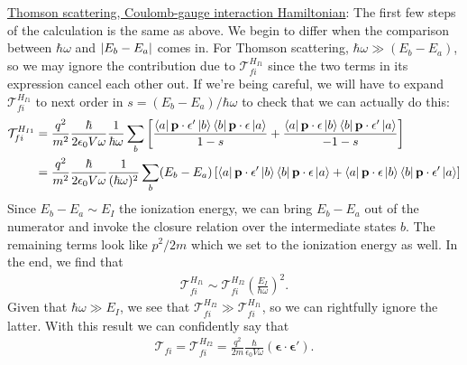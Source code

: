 \documentclass{article}
\theoremstyle{definition}
\newcommand{\f}[2]{\frac{#1}{#2}}
\newcommand{\lp}{\left(}
\newcommand{\rp}{\right)}
\newcommand{\lb}{\left[}
\newcommand{\rb}{\right]}
\begin{document}
\begin{enumerate}[label=(\alph*)]
\noindent \underline{Thomson scattering, Coulomb-gauge interaction Hamiltonian}:  The first few steps of the calculation is the same as above. We begin to differ when the comparison between $\hbar \omega$ and $\abs{E_b - E_a}$ comes in. For Thomson scattering, $\hbar \omega \gg (E_b - E_a)$, so we may ignore the contribution due to $\mathcal{T}_{fi}^{H_{I1}}$ since the two terms in its expression cancel each other out. If we're being careful, we will have to expand $\mathcal{T}_{fi}^{H_{I1}}$ to next order in $s = (E_b - E_a)/\hbar \omega$ to check that we can actually do this:
\begin{align*}
\mathcal{T}_{fi}^{H_{I1}}
&=
\f{q^2}{m^2} \f{\hbar }{2\epsilon_0 V \omega} \f{1}{\hbar\omega}
 \sum_b
 \lb 
 \f{\bra{a} \mathbf{p}\cdot \mathbf{\epsilon'}  \ket{b} \bra{b}  \mathbf{p}\cdot \mathbf{\epsilon} \ket{a}}{1-s}
 +
 \f{\bra{a}  \mathbf{p}\cdot \mathbf{\epsilon} \ket{b}\bra{b}  \mathbf{p}\cdot \mathbf{\epsilon'}  \ket{a}}{-1-s}
 \rb \\
 &= \f{q^2}{m^2} \f{\hbar }{2\epsilon_0 V \omega} \f{1}{(\hbar\omega)^2}
\sum_b 
(E_b - E_a)
\lb
 \bra{a} \mathbf{p}\cdot \mathbf{\epsilon'}  \ket{b} \bra{b}  \mathbf{p}\cdot \mathbf{\epsilon} \ket{a}
 + 
 \bra{a}  \mathbf{p}\cdot \mathbf{\epsilon} \ket{b}\bra{b}  \mathbf{p}\cdot \mathbf{\epsilon'}  \ket{a}
\rb
\end{align*}
Since $E_b - E_a \sim E_I$ the ionization energy, we can bring $E_b - E_a$ out of the numerator and invoke the closure relation over the intermediate states $b$. The remaining terms look like $p^2/2m$ which we set to the ionization energy as well. In the end, we find that
\begin{align*}
\mathcal{T}_{fi}^{H_{I1}} \sim \mathcal{T}_{fi}^{H_{I2}} \lp \f{E_I}{\hbar \omega} \rp^2. 
\end{align*}
Given that $\hbar \omega \gg E_I$, we see that $\mathcal{T}_{fi}^{H_{I2}} \gg \mathcal{T}_{fi}^{H_{I1}}$, so we can rightfully ignore the latter. With this result we can confidently say that
\begin{align*}
\mathcal{T}_{fi} = \mathcal{T}_{fi}^{H_{I2}} = 
 \f{q^2}{2m} \f{\hbar }{\epsilon_0 V \omega}(\mathbf{\epsilon} \cdot \mathbf{\epsilon'}).
\end{align*}




\end{enumerate}
\end{document}
